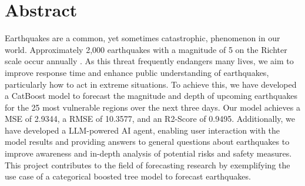 \chapter*{Abstract}

Earthquakes are a common, yet sometimes catastrophic, phenomenon in our world.
Approximately 2,000 earthquakes with a magnitude of 5 on the Richter scale
occur annually \parencite{welt_erdbeben}. As this threat frequently endangers
many lives, we aim to improve response time and enhance public understanding
of earthquakes, particularly how to act in extreme situations. To achieve this,
we have developed a CatBoost model to forecast the magnitude and depth of
upcoming earthquakes for the 25 most vulnerable regions over the next three days.
Our model achieves a \ac{MSE} of 2.9344, a \ac{RMSE} of 10.3577, and an R2-Score
of 0.9495. Additionally, we have developed a \ac{LLM}-powered AI agent,
enabling user interaction with the model results and
providing answers to general questions about earthquakes to improve awareness and
in-depth analysis of potential risks and safety measures. This project contributes
to the field of forecasting research by exemplifying the use case of a categorical
boosted tree model to forecast earthquakes.

